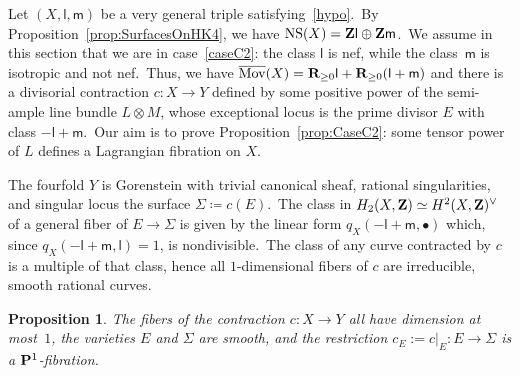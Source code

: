 \documentclass[12pt]{amsart}
\def\Z{{\bf Z}}
\def\R{{\bf R}}
\def\P{{\bf P}}
\DeclareMathOperator{\Mov}{\overline{Mov}}
\DeclareMathOperator{\NS}{NS}
\def\isom{\simeq}
\newtheorem{prop}[lemm]{Proposition}
\theoremstyle{remark}
\def\lll{\ensuremath{\mathsf l}}
\def\mm{\ensuremath{\mathsf m}}
\begin{document}
Let $(X,\lll,\mm)$ be a very general triple satisfying~\eqref{hypo}.\
By Proposition~\ref{prop:SurfacesOnHK4}, we have  $\NS(X)=\Z\lll\oplus\Z\mm$.\
We assume in this section that we are in case~\ref{caseC2}: the class $\lll$ is nef, while the class~$\mm$ is isotropic and not nef.\ Thus, we have  $\Mov(X)=\R_{\ge 0}\lll+\R_{\ge 0}(\lll+\mm)$ and there is a divisorial contraction  $c\colon X\to Y$ defined by  some positive power of the semi-ample line bundle $L\otimes M$, whose exceptional locus is the prime divisor $E$ with class $-\lll+\mm$.\
Our aim is to prove Proposition~\ref{prop:CaseC2}: some tensor power of $L$ defines a Lagrangian fibration on $X$.

The fourfold $Y$ is Gorenstein with trivial canonical sheaf, rational singularities, and singular locus the surface $\Sigma\coloneqq c(E)$.\
The class in $H_2(X,\Z)\isom H^2(X ,\Z)^\vee$ of a general fiber of $E\to \Sigma$ is given by the linear form $q_X(-\lll+\mm,\bullet)$ which, since   $q_X(-\lll+\mm,\lll)=1$, is nondivisible.\
The class of any curve contracted by $c$ is a multiple of that class, hence all $1$-dimensional fibers of $c$ are irreducible, smooth rational curves.

\begin{prop}\label{prop:NoFibersDimension2}
The fibers of the contraction $c\colon X\to Y$ all have dimension at most~$ 1$, the varieties $E$ and $\Sigma$ are smooth, and the restriction $c_E:=c\vert_E\colon E\to \Sigma$ is a $\P^1$-fibration.
\end{prop}
\end{document}
